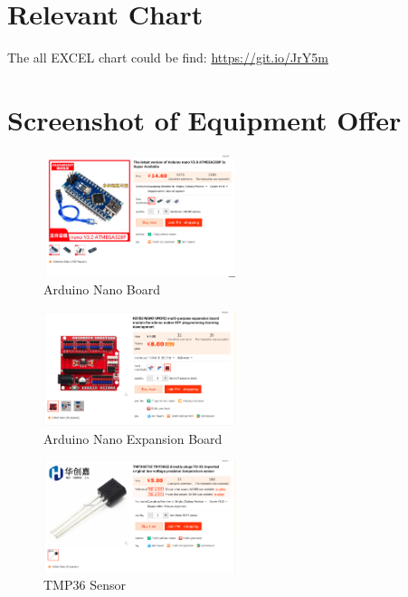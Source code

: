 \documentclass[a4paper,12pt]{article}
\begin{document}
\begin{appendices}
\section{Relevant Chart}
The all EXCEL chart could be find: \href{https://git.io/JrY5m}{https://git.io/JrY5m}

\section{Screenshot of Equipment Offer}


\begin{figure}[H] %
\centering %
\includegraphics[width=0.5\textwidth]{NANO.png} %
\caption{Arduino Nano Board} %
\end{figure}

\begin{figure}[H] %
\centering %
\includegraphics[width=0.5\textwidth]{Expansion.png} %
\caption{Arduino Nano Expansion Board} %
\end{figure}

\begin{figure}[H] %
\centering %
\includegraphics[width=0.5\textwidth]{tmp36.png} %
\caption{TMP36 Sensor} %
\end{figure}


\end{appendices}
\end{document}
